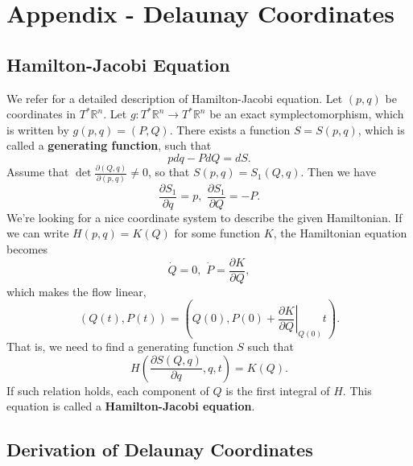 \documentclass{amsart}
\newcommand{\R}{\mathbb{R}}
\newcommand{\pp}{\partial}
\begin{document}

\section{Appendix - Delaunay Coordinates}\label{Appendix - Delaunay coordinates}

	\subsection{Hamilton-Jacobi Equation}
	
	We refer \cite{Arnold_89} for a detailed description of Hamilton-Jacobi equation.
	Let $(p,q)$ be coordinates in $T^*\R^n$.
	Let $g:T^*\R^n\to T^*\R^n$ be an exact symplectomorphism, which is written by $g(p,q)=(P,Q)$.
	There exists a function $S=S(p,q)$, which is called a \textbf{generating function}, such that
	$$
	pdq - PdQ = dS.
	$$
	Assume that $\det \frac{\pp(Q,q)}{\pp(p,q)}\neq0$, so that $S(p,q)=S_1(Q,q)$.
	Then we have
	$$
	\frac{\pp S_1}{\pp q} = p,\,\,\frac{\pp S_1}{\pp Q} = -P.
	$$
	We're looking for a nice coordinate system to describe the given Hamiltonian.
	If we can write $H(p,q)=K(Q)$ for some function $K$, the Hamiltonian equation becomes
	$$
	\dot{Q}=0,\,\,\dot{P}=\frac{\pp K}{\pp Q},
	$$
	which makes the flow linear,
	$$
	(Q(t),P(t)) = \left(Q(0),P(0)+\left.\frac{\pp K}{\pp Q}\right|_{Q(0)}t\right).
	$$
	That is, we need to find a generating function $S$ such that
	$$
	H\left(\frac{\pp S(Q,q)}{\pp q},q,t\right)=K(Q).
	$$
	If such relation holds, each component of $Q$ is the first integral of $H$.
	This equation is called a \textbf{Hamilton-Jacobi equation}.
	
	\subsection{Derivation of Delaunay Coordinates}
			
\end{document}
